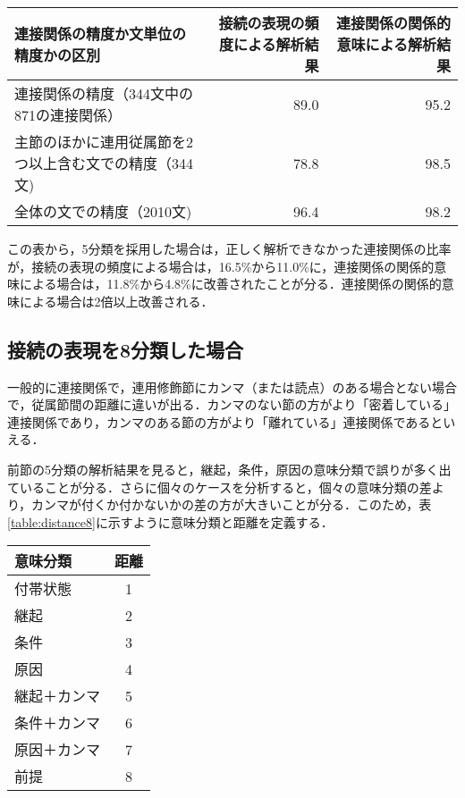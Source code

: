 \begin{table*}
\caption{5分類を用いた場合の連接構造の解析精度（単位：％） }
\label{table:acc5}
\begin{tabular}{|l|r|r|}
\hline
\multicolumn{1}{|p{20zw}|}{連接関係の精度か文単位の精度かの区別} & \multicolumn{1}{|p{5zw}|}{接続の表現の頻度による解析結果} & \multicolumn{1}{|p{5zw}|}{連接関係の関係的意味による解析結果}\\
\hline
連接関係の精度（344文中の871の連接関係）&  89.0 &  95.2 \\
主節のほかに連用従属節を2つ以上含む文での精度（344文) & 78.8 & 98.5 \\
全体の文での精度（2010文) & 96.4 & 98.2 \\
\hline
\end{tabular}
\end{table*}

この表から，5分類を採用した場合は，正しく解析できなかった連接関係の比率が，接続の表現の頻度による場合は，16.5\%から11.0\%に，連接関係の関係的意味による場合は，11.8\%から4.8\%に改善されたことが分る．連接関係の関係的意味による場合は2倍以上改善される．

\subsection{接続の表現を8分類した場合}
一般的に連接関係で，連用修飾節にカンマ（または読点）のある場合とない場合で，従属節間の距離に違いが出る．カンマのない節の方がより「密着している」連接関係であり，カンマのある節の方がより「離れている」連接関係であるといえる．

前節の5分類の解析結果を見ると，継起，条件，原因の意味分類で誤りが多く出ていることが分る．さらに個々のケースを分析すると，個々の意味分類の差より，カンマが付くか付かないかの差の方が大きいことが分る．このため，表\ref{table:distance8}に示すように意味分類と距離を定義する．

\begin{table*}
\caption{8分類の連接関係の意味分類}
\label{table:distance8}
\hspace*{40mm}
\begin{tabular}{|l|c|}
\hline
\multicolumn{1}{|p{8zw}|}{意味分類} & \multicolumn{1}{|p{5zw}|}{距離} \\
\hline
付帯状態 & 1 \\
継起 & 2 \\
条件 & 3 \\
原因 & 4 \\
継起＋カンマ & 5 \\
条件＋カンマ & 6 \\
原因＋カンマ & 7 \\
前提 & 8 \\
\hline
\end{tabular}
\end{table*}

